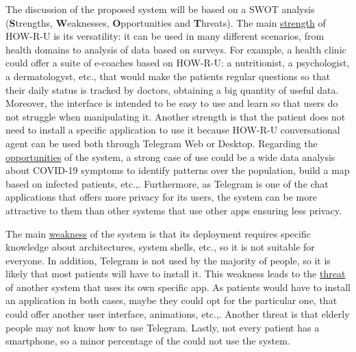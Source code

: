 \documentclass[12pt,english]{article}
\begin{document}
The discussion of the proposed system will be based on a SWOT analysis (\textbf{S}trengths, \textbf{W}eaknesses, \textbf{O}pportunities and \textbf{T}hreats). The main \underline{strength} of HOW-R-U is its versatility: it can be used in many different scenarios, from health domains to analysis of data based on surveys. For example, a health clinic could offer a suite of e-coaches based on HOW-R-U: a nutritionist, a psychologist, a dermatologyst, etc., that would make the patients regular questions so that their daily status is tracked by doctors, obtaining a big quantity of useful data.  Moreover, the interface is intended to be easy to use and learn so that users do not struggle when manipulating it. Another strength is that the patient does not need to install a specific application to use it because HOW-R-U conversational agent can be used both through Telegram Web or Desktop. Regarding the \underline{opportunities} of the system, a strong case of use could be a wide data analysis about COVID-19 symptoms to identify patterns over the population, build a map based on infected patients, etc.,. Furthermore, as Telegram is one of the chat applications that offers more privacy for its users, the system can be more attractive to them than other systems that use other apps ensuring less privacy.


The main \underline{weakness} of the system is that its deployment requires specific knowledge about architectures, system shells, etc., so it is not suitable for everyone. In addition,  Telegram is not used by the majority of people, so it is likely that most patients will have to install it. This weakness leads to the  \underline{threat} of another system that uses its own specific app. As patients would have to install an application in both cases, maybe they could opt for the particular one, that could offer another user interface, animations, etc.,. Another threat is that elderly people may not know how to use Telegram. Lastly, not every patient has a smartphone, so a minor percentage of the could not use the system.
\end{document}
